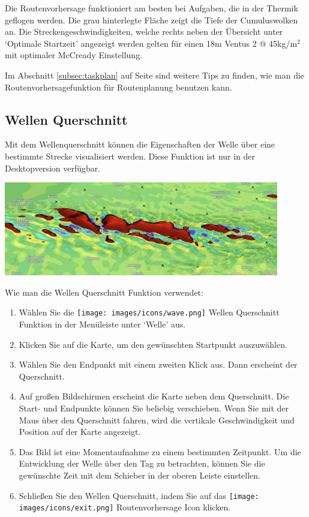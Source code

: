 \documentclass[11pt,a4paper]{article}
\begin{document}
Die Routenvorhersage funktioniert am besten bei Aufgaben, die in der Thermik geflogen werden. Die grau hinterlegte Fläche zeigt die Tiefe der Cumuluswolken an. Die Streckengeschwindigkeiten, welche rechts neben der Übersicht unter `Optimale Startzeit' angezeigt werden gelten für einen 18m Ventus 2 @ 45kg/m\(^2\) mit optimaler McCready Einstellung.
\begin{tip}
\item Im Abschnitt \ref{subsec:taskplan} auf Seite \pageref{subsec:taskplan} sind weitere Tips zu finden, wie man die Routenvorhersagefunktion für Routenplanung benutzen kann.
\end{tip}

\subsection{Wellen Querschnitt}
Mit dem Wellenquerschnitt können die Eigenschaften der Welle über eine bestimmte Strecke visualisiert werden. Diese Funktion ist nur in der Desktopversion verfügbar.
\begin{center}
\includegraphics[width=12cm]{images/3dwave.png}
\end{center}

Wie man die Wellen Querschnitt Funktion verwendet:
\begin{enumerate}
\item Wählen Sie die \texttt{[image: images/icons/wave.png]} Wellen Querschnitt Funktion in der Menüleiste unter `Welle' aus.
\item Klicken Sie auf die Karte, um den gewünschten Startpunkt auszuwählen.
\item Wählen Sie den Endpunkt mit einem zweiten Klick aus. Dann erscheint der Querschnitt.
\item Auf großen Bildschirmen erscheint die Karte neben dem Querschnitt. Die Start- und Endpunkte können Sie beliebig verschieben. Wenn Sie mit der Maus über den Querschnitt fahren, wird die vertikale Geschwindigkeit und Position auf der Karte angezeigt.
\item Das Bild ist eine Momentaufnahme zu einem bestimmten Zeitpunkt. Um die Entwicklung der Welle über den Tag zu betrachten, können Sie die gewünschte Zeit mit dem Schieber in der oberen Leiste einstellen.
\item Schließen Sie den Wellen Querschnitt, indem Sie auf das \texttt{[image: images/icons/exit.png]} Routenvorhersage Icon klicken.
\end{enumerate}
\end{document}
